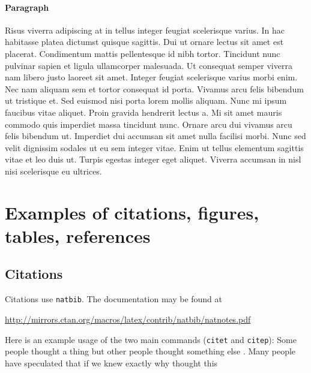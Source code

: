 \paragraph{Paragraph}
Risus viverra adipiscing at in tellus integer feugiat scelerisque varius. In hac habitasse platea dictumst quisque sagittis. Dui ut ornare lectus sit amet est placerat. Condimentum mattis pellentesque id nibh tortor. Tincidunt nunc pulvinar sapien et ligula ullamcorper malesuada. Ut consequat semper viverra nam libero justo laoreet sit amet. Integer feugiat scelerisque varius morbi enim. Nec nam aliquam sem et tortor consequat id porta. Vivamus arcu felis bibendum ut tristique et. Sed euismod nisi porta lorem mollis aliquam. Nunc mi ipsum faucibus vitae aliquet. Proin gravida hendrerit lectus a. Mi sit amet mauris commodo quis imperdiet massa tincidunt nunc. Ornare arcu dui vivamus arcu felis bibendum ut. Imperdiet dui accumsan sit amet nulla facilisi morbi. Nunc sed velit dignissim sodales ut eu sem integer vitae. Enim ut tellus elementum sagittis vitae et leo duis ut. Turpis egestas integer eget aliquet. Viverra accumsan in nisl nisi scelerisque eu ultrices.



\section{Examples of citations, figures, tables, references}
\label{sec:others}

\subsection{Citations}
Citations use \verb+natbib+. The documentation may be found at
\begin{center}
	\url{http://mirrors.ctan.org/macros/latex/contrib/natbib/natnotes.pdf}
\end{center}

Here is an example usage of the two main commands (\verb+citet+ and \verb+citep+): Some people thought a thing \citep{kour2014real, hadash2018estimate} but other people thought something else \citep{kour2014fast}. Many people have speculated that if we knew exactly why \citet{kour2014fast} thought this

